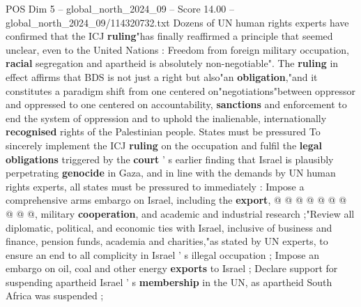 \begin{textsample}{POS Dim 5 – global\_north\_2024\_09 – Score 14.00 – global\_north\_2024\_09/114320732.txt}
Dozens of UN human rights experts have confirmed that the ICJ \textbf{ruling}"has finally reaffirmed a principle that seemed unclear, even to the United Nations : Freedom from foreign military occupation, \textbf{racial} segregation and apartheid is absolutely non-negotiable".
The \textbf{ruling} in effect affirms that BDS is not just a right but also"an \textbf{obligation},"and it constitutes a paradigm shift from one centered on"negotiations"between oppressor and oppressed to one centered on accountability, \textbf{sanctions} and enforcement to end the system of oppression and to uphold the inalienable, internationally \textbf{recognised} rights of the Palestinian people.
States must be pressured To sincerely implement the ICJ \textbf{ruling} on the occupation and fulfil the \textbf{legal} \textbf{obligations} triggered by the \textbf{court} ' s earlier finding that Israel is plausibly perpetrating \textbf{genocide} in Gaza, and in line with the demands by UN human rights experts, all states must be pressured to immediately : Impose a comprehensive arms embargo on Israel, including the \textbf{export}, @ @ @ @ @ @ @ @ @ @, military \textbf{cooperation}, and academic and industrial research ;"Review all diplomatic, political, and economic ties with Israel, inclusive of business and finance, pension funds, academia and charities,"as stated by UN experts, to ensure an end to all complicity in Israel ' s illegal occupation ; Impose an embargo on oil, coal and other energy \textbf{exports} to Israel ; Declare support for suspending apartheid Israel ' s \textbf{membership} in the UN, as apartheid South Africa was suspended ;

\end{textsample}
